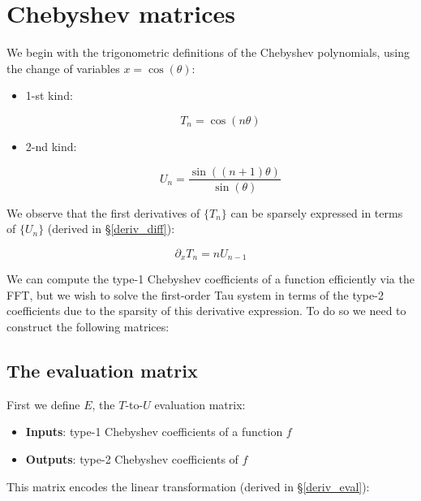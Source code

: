 \documentclass{article}
\begin{document}
\section{Chebyshev matrices}

We begin with the trigonometric definitions of the Chebyshev polynomials, using the change of variables $x = \cos(\theta)$:

\begin{itemize}
    \item 1-st kind:
    
    \begin{equation*}
    T_n = \cos(n \theta)
    \end{equation*}
    
    \item 2-nd kind:
    
    \begin{equation*}
    U_n = \frac{\sin((n+1) \theta)}{\sin(\theta)}
    \end{equation*}
\end{itemize}

We observe that the first derivatives of $\{T_n\}$ can be sparsely expressed in terms of $\{U_n\}$ (derived in \S \ref{deriv_diff}):

\begin{equation*}
\partial_x T_n = n U_{n-1}
\end{equation*}

We can compute the type-1 Chebyshev coefficients of a function efficiently via the FFT, but we wish to solve the first-order Tau system in terms of the type-2 coefficients due to the sparsity of this derivative expression.  To do so we need to construct the following matrices:

\subsection{The evaluation matrix}

First we define $E$, the $T$-to-$U$ evaluation matrix:

\begin{itemize}
    \item \textbf{Inputs}: type-1 Chebyshev coefficients of a function $f$
    \item \textbf{Outputs}: type-2 Chebyshev coefficients of $f$
\end{itemize}

This matrix encodes the linear transformation (derived in \S \ref{deriv_eval}):
\end{document}
